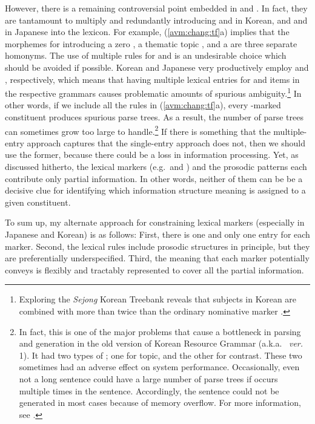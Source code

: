 However, there is a remaining controversial point embedded in
 and .  In fact,
they are tantamount to multiply and redundantly introducing \ika and
\nun in Korean, and \ga and \wa in Japanese into the lexicon. For
example, (\ref{avm:chang:tf}a) implies that the morphemes for
introducing a zero  \nun, a thematic topic \nun, and a
 \nun are three separate homonyms.  The use of
multiple rules for \nun and \wa is an undesirable choice which should
be avoided if possible.  Korean and Japanese very productively employ
\nun and \wa, respectively, which means that having multiple lexical
entries for \wa and \nun items in the respective grammars causes
problematic amounts of spurious ambiguity.\footnote{Exploring the
  \textit{Sejong} Korean Treebank reveals that subjects in Korean are
  combined with \nun more than twice than the ordinary nominative
  marker \ika.} In other words, if we include all the rules in
(\ref{avm:chang:tf}a), every \nun-marked constituent produces spurious
parse trees.  As a result, the number of parse trees can sometimes
grow too large to handle.\footnote{In fact, this is one of the major
  problems that cause a bottleneck in parsing and generation in the
  old version of Korean Resource Grammar (a.k.a.\  \textit{ver.}
  1). It had two types of \nun; one for topic, and the other for
  contrast. These two \nun sometimes had an adverse effect on system
  performance.  Occasionally, even not a long sentence could have a
  large number of parse trees if \nun occurs multiple times in the
  sentence. Accordingly, the sentence could not be generated in most
  cases because of memory overflow. For more information, see
  \citet{song:etal:10}.}  If there is something that the
multiple-entry approach captures that the single-entry approach does
not, then we should use the former, because there could be a loss in
information processing. Yet, as discussed hitherto, the lexical
markers (e.g.\ \nun and \wa) and the prosodic patterns each contribute
only partial information. In other words, neither of them can be be a
decisive clue for identifying which information structure meaning is
assigned to a given constituent.



To sum up, my alternate approach for constraining lexical markers
(especially in Japanese and Korean) is as follows:
First, there is one and only one entry for each marker. Second, the
lexical rules include prosodic structures in principle, but they are
preferentially underspecified. Third, the meaning that each marker
potentially conveys is flexibly and tractably represented to cover all
the partial information.



